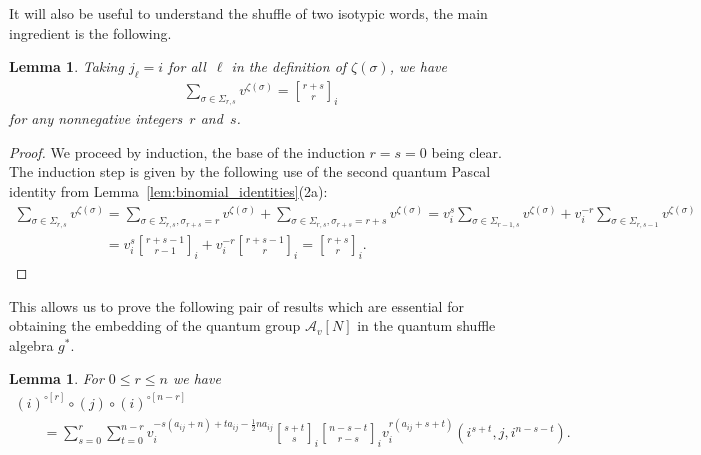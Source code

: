 \documentclass[pdftex]{sigma}
\numberwithin{equation}{section}
\newtheorem{Lemma}[Theorem]{Lemma}
\begin{document}
It will also be useful to understand the shuf\/f\/le of two isotypic words, the main ingredient is the following.
\begin{Lemma}
\label{lem:shuffle_binomial}
Taking $j_\ell=i$ for all~$\ell$ in the definition of $\zeta(\sigma)$, we have
\begin{gather*}
\sum\limits_{\sigma\in\Sigma_{r,s}}v^{\zeta(\sigma)}={r+s\brack r}_i
\end{gather*}
for any nonnegative integers~$r$ and~$s$.
\end{Lemma}

\begin{proof}
We proceed by induction, the base of the induction $r=s=0$ being clear.
The induction step is given by the following use of the second quantum Pascal identity from
Lemma~\ref{lem:binomial_identities}(2a):
\begin{gather*}
\sum\limits_{\sigma\in\Sigma_{r,s}}v^{\zeta(\sigma)}
 =\sum\limits_{\sigma\in\Sigma_{r,s},\sigma_{r+s}=r}\!v^{\zeta(\sigma)}+\sum\limits_{\sigma\in\Sigma_{r,s},\sigma_{r+s}=r+s}\! v^{\zeta(\sigma)}
 =v_i^s\sum\limits_{\sigma\in\Sigma_{r-1,s}}\!v^{\zeta(\sigma)}+v_i^{-r}\sum\limits_{\sigma\in\Sigma_{r,s-1}}\!v^{\zeta(\sigma)}
\\
\phantom{\sum\limits_{\sigma\in\Sigma_{r,s}}v^{\zeta(\sigma)}}
 =v_i^s{r+s-1\brack r-1}_i+v_i^{-r}{r+s-1\brack r}_i
 ={r+s\brack r}_i.  \tag*{\qed}
\end{gather*}
\renewcommand{\qed}{}
\end{proof}


This allows us to prove the following pair of results which are essential for obtaining the embedding of the quantum
group $\mathcal{A}_v[N]$ in the quantum shuf\/f\/le algebra $g^*$.
\begin{Lemma}
\label{lem:rank 2 shuffles}
For $0\le r\le n$ we have
\begin{gather*}
(i)^{\circ[r]}\circ(j)\circ(i)^{\circ[n-r]}
\\
\qquad
=\sum\limits_{s=0}^r\sum\limits_{t=0}^{n-r}
v_i^{-s(a_{ij}+n)+ta_{ij}-\frac{1}{2} na_{ij}} {s+t\brack s}_i {n-s-t\brack r-s}_i v_i^{r(a_{ij}+s+t)}(i^{s+t},j,i^{n-s-t}).
\end{gather*}
\end{Lemma}
\end{document}
